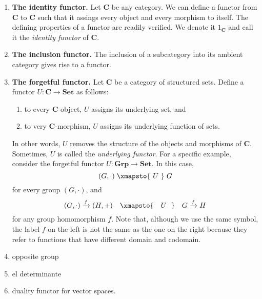\begin{example}
\begin{enumerate}[label=(\alph*)]
    \item \textbf{The identity functor.} 
    Let \(\mathbf{C}\) be any category.
    We can define a functor from \(\mathbf{C}\) to \(\mathbf{C}\)  such that it assings every object and every morphism  to itself.
    The defining properties of a functor are readily verified.
    We denote it   \(1_{\mathbf{C}}  \) and call it  the \textit{identity functor} of \(\mathbf{C}\).
    \item \textbf{The inclusion functor.} The inclusion of a subcategory into its ambient category gives rise to a functor.
    \item \textbf{The forgetful functor.} Let \(\mathbf{C}\) be a category of structured sets. Define a functor \(U\colon \mathbf{C}\to \mathbf{Set}\) as follows:
    \begin{enumerate}[label=(\roman*)]
        \item to every \(\mathbf{C}\)-object, \(U\) assigns its underlying set, and
        \item to very \(\mathbf{C}\)-morphism, \(U\) assigns its underlying function of sets.
    \end{enumerate} 
    In other words, \(U\) removes the structure of the objects and morphisms of \(\mathbf{C}\).
    Sometimes, \(U\) is called the \textit{underlying functor}.
    For a specific example, consider the forgetful functor \(U\colon \mathbf{Grp}\to \mathbf{Set}\).
    In this case,  
    \[(G,\cdot ) \;\xmapsto{\text{   } U \text{  }}\; G\]
    for every group \((G, \cdot)\), and  
    \[ (G,\cdot )\xrightarrow{f}(H, +)\quad\xmapsto{\text{ { } } U \text{ { }}}\quad G\xrightarrow{f} H\]
    for any group homomorphism \(f\). %
    Note that, although we use the same symbol, the label \(f\) on the left is not the same as the one on the right because they refer to functions that have different domain and codomain.

    \item opposite group
    \item el determinante
    \item duality functor for vector spaces.

\end{enumerate}
\end{example}


